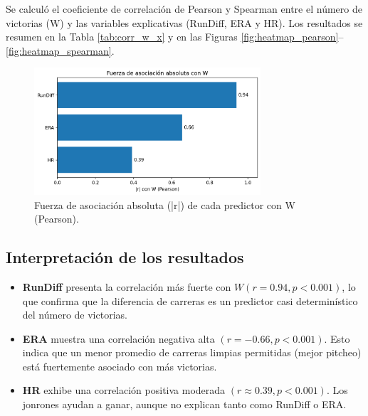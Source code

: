 \documentclass[man,floatsintext]{apa7}
\begin{document}
Se calculó el coeficiente de correlación de Pearson y Spearman entre el número de victorias (W) y las variables explicativas 
(RunDiff, ERA y HR). Los resultados se resumen en la Tabla \ref{tab:corr_w_x} y en las Figuras 
\ref{fig:heatmap_pearson}--\ref{fig:heatmap_spearman}.



\begin{figure}[H]
    \centering
    \includegraphics[width=0.75\textwidth]{../plots/final_version/bar_abs_r_W.png}
    \caption{Fuerza de asociación absoluta (|r|) de cada predictor con W (Pearson).}
    \label{fig:bar_abs_r}
\end{figure}

\subsection{Interpretación de los resultados}

\begin{itemize}
    \item \textbf{RunDiff} presenta la correlación más fuerte con $W (r = 0.94, p < 0.001)$, lo que confirma que la diferencia de carreras es un predictor casi determinístico del número de victorias.
    \item \textbf{ERA} muestra una correlación negativa alta $(r = -0.66, p < 0.001)$. Esto indica que un menor promedio de carreras limpias permitidas (mejor pitcheo) está fuertemente asociado con más victorias.
    \item \textbf{HR} exhibe una correlación positiva moderada $(r \approx 0.39, p < 0.001)$. Los jonrones ayudan a ganar, aunque no explican tanto como RunDiff o ERA.
\end{itemize}
\end{document}
